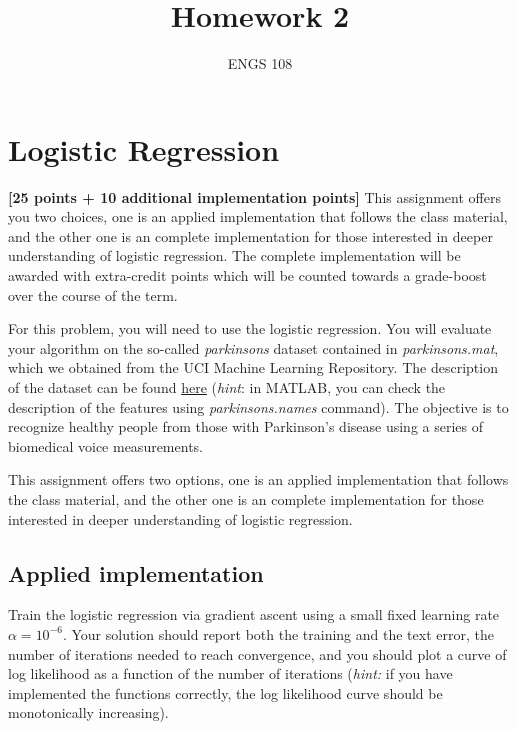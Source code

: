 \documentclass[12pt]{article}
\newenvironment{problem}[2][Problem:]{\begin{trivlist}
\item[\hskip \labelsep {\bfseries #1}\hskip \labelsep {\bfseries #2.}]}{\end{trivlist}}
\begin{document}
 
 
\title{Homework 2}
\author{ENGS 108}
\maketitle

\pagebreak
\section{Logistic Regression} 
\textbf{[25 points + 10 additional implementation points]} 
This assignment offers you two choices, one is an applied implementation that follows the class material, and the other one is an complete implementation for those interested in deeper understanding of logistic regression. The complete implementation will be awarded with extra-credit points which will be counted towards a grade-boost over the course of the term. 

For this problem, you will need to use the logistic regression.
You will evaluate your algorithm on the so-called \textit{parkinsons} dataset contained in \textit{parkinsons.mat}, which we
obtained from the UCI Machine Learning Repository. The description of the dataset can be found \href{https://archive.ics.uci.edu/ml/datasets/parkinsons+telemonitoring}{here} (\textit{hint}: in MATLAB, you can check the description of the features using \textit{parkinsons.names} command). The objective is to recognize healthy people from those with Parkinson's disease using a series of biomedical voice measurements.

This assignment offers two options, one is an applied implementation that follows the class material, and the other one is an complete implementation for those interested in deeper understanding of logistic regression. 

\subsection{Applied implementation}
\begin{problem}{Programming: Naive Logistic Regression [13 points]}
Train the logistic regression via gradient ascent using a small fixed learning rate $\alpha = 10^{-6}$. Your solution should report both the training and the text error, the number of iterations needed to reach convergence, and you should plot a curve of log likelihood as a function of the number of iterations (\textit{hint:} if you have implemented the functions correctly, the log likelihood curve should be monotonically increasing).
\end{problem}
\end{document}
